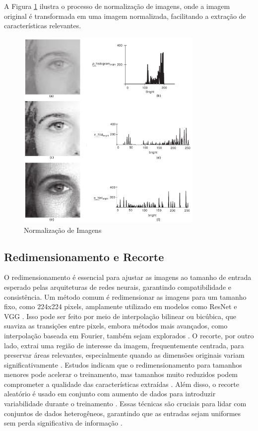 A Figura \ref{fig:normalizacao} ilustra o processo de normalização de imagens, onde a imagem original é transformada em uma imagem normalizada, facilitando a extração de características relevantes.

\begin{figure}[H]
    \centering
    \caption{\label{fig:normalizacao}Normalização de Imagens}
    \includegraphics[width=0.8\textwidth]{img/revisao_bibliografica/normalizacao.png}
\end{figure}

\subsection{Redimensionamento e Recorte}
O redimensionamento é essencial para ajustar as imagens ao tamanho de entrada esperado pelas arquiteturas de redes neurais, garantindo compatibilidade e consistência. Um método comum é redimensionar as imagens para um tamanho fixo, como 224x224 pixels, amplamente utilizado em modelos como ResNet e VGG \cite{chen2023robustness}. Isso pode ser feito por meio de interpolação bilinear ou bicúbica, que suaviza as transições entre pixels, embora métodos mais avançados, como interpolação baseada em Fourier, também sejam explorados \cite{dennanni2019resizing}. O recorte, por outro lado, extrai uma região de interesse da imagem, frequentemente centrada, para preservar áreas relevantes, especialmente quando as dimensões originais variam significativamente \cite{sciencedirect2023normalization}. Estudos indicam que o redimensionamento para tamanhos menores pode acelerar o treinamento, mas tamanhos muito reduzidos podem comprometer a qualidade das características extraídas \cite{sabottke2020effect}. Além disso, o recorte aleatório é usado em conjunto com aumento de dados para introduzir variabilidade durante o treinamento \cite{nalepa2022data}. Essas técnicas são cruciais para lidar com conjuntos de dados heterogêneos, garantindo que as entradas sejam uniformes sem perda significativa de informação \cite{chen2023robustness}.

